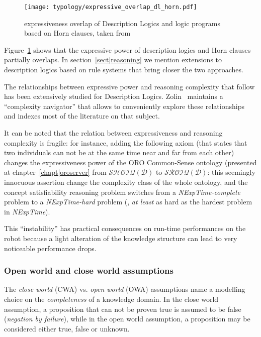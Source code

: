 \begin{figure}
    \centering
    \texttt{[image: typology/expressive\_overlap\_dl\_horn.pdf]}
    \caption{expressiveness overlap of Description Logics and logic programs
    based on Horn clauses, taken from~\cite{Grosof2003}}
    \label{fig|overlap_dl_horn}
\end{figure}

Figure~\ref{fig|overlap_dl_horn} shows that the expressive power of description
logics and Horn clauses partially overlaps. In section~\ref{sect|reasoning} we
mention extensions to description logics based on rule systems that bring closer
the two approaches.

The relationships between expressive power and reasoning complexity that follow
has been extensively studied for Description Logics.
Zolin~\cite{ZolinDLComplexityNavigator} maintains a ``complexity navigator''
that allows to conveniently explore these relationships and indexes most of the
literature on that subject.

It can be noted that the relation between expressiveness and reasoning
complexity is fragile: for instance, adding the following axiom  (that states that two individuals can not be at the
same time near and far from each other) changes the expressiveness power of
the ORO Common-Sense ontology (presented at chapter~\ref{chapt|oroserver}
from $\mathcal{SHOIQ(D)}$ to $\mathcal{SROIQ(D)}$: this seemingly innocuous
assertion change the complexity class of the whole ontology, and the concept
satisfiability reasoning problem switches from a {\it NExpTime-complete}
problem to a {\it NExpTime-hard} problem (\ie, \emph{at least} as hard as the
hardest problem in {\it NExpTime}).

This ``instability'' has practical consequences on run-time performances on
the robot because a light alteration of the knowledge structure can lead to
very noticeable performance drops.


\subsubsection{Open world and close world assumptions}
\label{sect|owa-cwa}

The \emph{close world} (CWA) vs. \emph{open world} (OWA) assumptions name a
modelling choice on the \emph{completeness} of a knowledge domain. In the close
world assumption, a proposition that can not be proven true is assumed to be
false (\emph{negation by failure}), while in the open world assumption, a
proposition may be considered either true, false or unknown.

